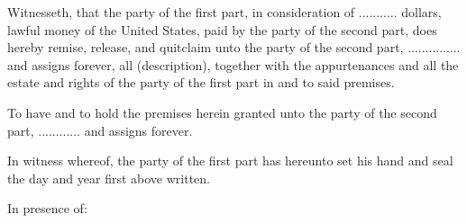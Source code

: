 Witnesseth, that the party of the first part, in consideration of ...........
dollars, lawful money of the United States, paid by the party of the second
part, does hereby remise, release, and quitclaim unto the party of the second
part, ............... and assigns forever, all (description), together with the
appurtenances and all the estate and rights of the party of the first part in
and to said premises. 

To have and to hold the premises herein granted unto the party of the second
part, ............ and assigns forever. 

In witness whereof, the party of the first part has hereunto set his hand and
seal the day and year first above written. 

In presence of: 

